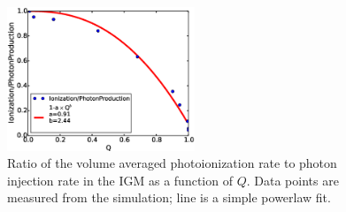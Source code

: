 \begin{figure}
	\includegraphics[width=0.5\textwidth]{RatiovsQfit.eps}
	\caption{Ratio of the volume averaged \hi photoionization rate to photon injection rate in the IGM as a function of $Q$. Data points are measured from the simulation; line is a simple powerlaw fit. }
	\label{RatiovsQfit}
\end{figure}

